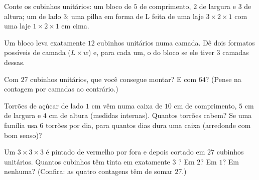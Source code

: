 \begin{exercise}[$\star$]\label{exo:g5:solids:6}
Conte os cubinhos unitários: um bloco de $5$ de comprimento, $2$ de
largura e $3$ de altura; um  de lado $3$; uma pilha em forma de L
feita de uma laje $3 \times 2 \times 1$ com uma laje
$1 \times 2 \times 1$ em cima.
\end{exercise}

\begin{exercise}[$\star$]\label{exo:g5:solids:7}
Um bloco leva exatamente $12$ cubinhos unitários numa camada. Dê dois
formatos possíveis de camada ($L \times w$) e, para cada um, o 
do bloco se ele tiver $3$ camadas dessas.
\end{exercise}

\begin{exercise}[$\star$]\label{exo:g5:solids:8}
Com $27$ cubinhos unitários, que  você consegue montar? E com
$64$? (Pense na contagem por camadas ao contrário.)
\end{exercise}

\begin{exercise}[$\star\star$]\label{exo:g5:solids:9}
Torrões de açúcar de lado $1$ cm vêm numa caixa de $10$ cm de
comprimento, $5$ cm de largura e $4$ cm de altura (medidas internas).
Quantos torrões cabem? Se uma família usa $6$ torrões por dia, para
quantos dias dura uma caixa (arredonde com bom senso)?
\end{exercise}

\begin{exercise}[$\star\star$]\label{exo:g5:solids:10}
Um  $3 \times 3 \times 3$ é pintado de vermelho por fora e depois
cortado em $27$ cubinhos unitários. Quantos cubinhos têm tinta em
exatamente $3$ ? Em $2$? Em $1$? Em nenhuma? (Confira: as quatro
contagens têm de somar $27$.)
\end{exercise}
